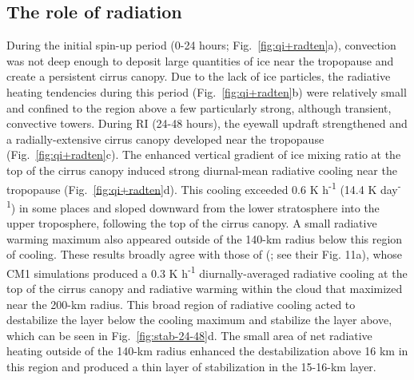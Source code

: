 \documentclass{ametsoc}
\begin{document}
  \subsection{The role of radiation}
During the initial spin-up period (0-24 hours; Fig.~\ref{fig:qi+radten}a), convection was not deep enough to deposit large quantities of ice near the tropopause and create a persistent cirrus canopy.
Due to the lack of ice particles, the radiative heating tendencies during this period (Fig.~\ref{fig:qi+radten}b) were relatively small and confined to the region above a few particularly strong, although transient, convective towers.
During RI (24-48 hours), the eyewall updraft strengthened and a radially-extensive cirrus canopy developed near the tropopause (Fig.~\ref{fig:qi+radten}c).
The enhanced vertical gradient of ice mixing ratio at the top of the cirrus canopy induced strong diurnal-mean radiative cooling near the tropopause (Fig.~\ref{fig:qi+radten}d).
This cooling exceeded 0.6 K h\textsuperscript{-1} (14.4 K day\textsuperscript{-1}) in some places and sloped downward from the lower stratosphere into the upper troposphere, following the top of the cirrus canopy.
A small radiative warming maximum also appeared outside of the 140-km radius below this region of cooling.
These results broadly agree with those of \citeauthor{buetal} (\citeyear{buetal}; see their Fig. 11a), whose CM1 simulations produced a 0.3 K h\textsuperscript{-1} diurnally-averaged radiative cooling at the top of the cirrus canopy and radiative warming within the cloud that maximized near the 200-km radius.
This broad region of radiative cooling acted to destabilize the layer below the cooling maximum and stabilize the layer above, which can be seen in Fig.~\ref{fig:stab-24-48}d.
The small area of net radiative heating outside of the 140-km radius enhanced the destabilization above 16 km in this region and produced a thin layer of stabilization in the 15-16-km layer.
\end{document}

